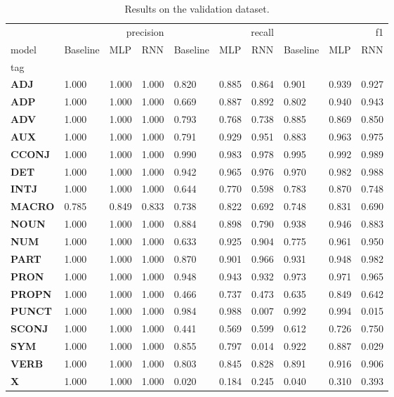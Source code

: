\begin{table}
\caption{Results on the validation dataset.}
\label{tab::ex_2_valid}
\begin{tabular}{|l||l||l||l||l||l||l||l||l||l|}
\toprule
 & \multicolumn{3}{r}{precision} & \multicolumn{3}{r}{recall} & \multicolumn{3}{r}{f1} \\
model & Baseline & MLP & RNN & Baseline & MLP & RNN & Baseline & MLP & RNN \\
tag &  &  &  &  &  &  &  &  &  \\
\midrule
\textbf{ADJ} & 1.000 & 1.000 & 1.000 & 0.820 & 0.885 & 0.864 & 0.901 & 0.939 & 0.927 \\
\textbf{ADP} & 1.000 & 1.000 & 1.000 & 0.669 & 0.887 & 0.892 & 0.802 & 0.940 & 0.943 \\
\textbf{ADV} & 1.000 & 1.000 & 1.000 & 0.793 & 0.768 & 0.738 & 0.885 & 0.869 & 0.850 \\
\textbf{AUX} & 1.000 & 1.000 & 1.000 & 0.791 & 0.929 & 0.951 & 0.883 & 0.963 & 0.975 \\
\textbf{CCONJ} & 1.000 & 1.000 & 1.000 & 0.990 & 0.983 & 0.978 & 0.995 & 0.992 & 0.989 \\
\textbf{DET} & 1.000 & 1.000 & 1.000 & 0.942 & 0.965 & 0.976 & 0.970 & 0.982 & 0.988 \\
\textbf{INTJ} & 1.000 & 1.000 & 1.000 & 0.644 & 0.770 & 0.598 & 0.783 & 0.870 & 0.748 \\
\textbf{MACRO} & 0.785 & 0.849 & 0.833 & 0.738 & 0.822 & 0.692 & 0.748 & 0.831 & 0.690 \\
\textbf{NOUN} & 1.000 & 1.000 & 1.000 & 0.884 & 0.898 & 0.790 & 0.938 & 0.946 & 0.883 \\
\textbf{NUM} & 1.000 & 1.000 & 1.000 & 0.633 & 0.925 & 0.904 & 0.775 & 0.961 & 0.950 \\
\textbf{PART} & 1.000 & 1.000 & 1.000 & 0.870 & 0.901 & 0.966 & 0.931 & 0.948 & 0.982 \\
\textbf{PRON} & 1.000 & 1.000 & 1.000 & 0.948 & 0.943 & 0.932 & 0.973 & 0.971 & 0.965 \\
\textbf{PROPN} & 1.000 & 1.000 & 1.000 & 0.466 & 0.737 & 0.473 & 0.635 & 0.849 & 0.642 \\
\textbf{PUNCT} & 1.000 & 1.000 & 1.000 & 0.984 & 0.988 & 0.007 & 0.992 & 0.994 & 0.015 \\
\textbf{SCONJ} & 1.000 & 1.000 & 1.000 & 0.441 & 0.569 & 0.599 & 0.612 & 0.726 & 0.750 \\
\textbf{SYM} & 1.000 & 1.000 & 1.000 & 0.855 & 0.797 & 0.014 & 0.922 & 0.887 & 0.029 \\
\textbf{VERB} & 1.000 & 1.000 & 1.000 & 0.803 & 0.845 & 0.828 & 0.891 & 0.916 & 0.906 \\
\textbf{X} & 1.000 & 1.000 & 1.000 & 0.020 & 0.184 & 0.245 & 0.040 & 0.310 & 0.393 \\
\bottomrule
\end{tabular}
\end{table}
